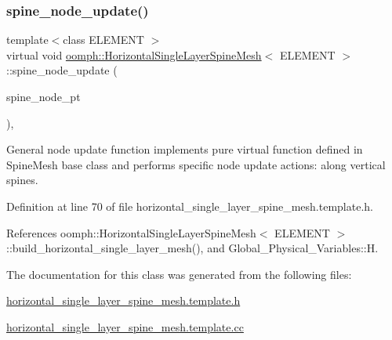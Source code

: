 \subsubsection{\texorpdfstring{spine\+\_\+node\+\_\+update()}{spine\_node\_update()}}
{\footnotesize\ttfamily template$<$class E\+L\+E\+M\+E\+NT $>$ \\
virtual void \hyperlink{classoomph_1_1HorizontalSingleLayerSpineMesh}{oomph\+::\+Horizontal\+Single\+Layer\+Spine\+Mesh}$<$ E\+L\+E\+M\+E\+NT $>$\+::spine\+\_\+node\+\_\+update (\begin{DoxyParamCaption}\item[{Spine\+Node $\ast$}]{spine\+\_\+node\+\_\+pt }\end{DoxyParamCaption})\hspace{0.3cm}{\ttfamily [inline]}, {\ttfamily [virtual]}}



General node update function implements pure virtual function defined in Spine\+Mesh base class and performs specific node update actions\+: along vertical spines. 



Definition at line 70 of file horizontal\+\_\+single\+\_\+layer\+\_\+spine\+\_\+mesh.\+template.\+h.



References oomph\+::\+Horizontal\+Single\+Layer\+Spine\+Mesh$<$ E\+L\+E\+M\+E\+N\+T $>$\+::build\+\_\+horizontal\+\_\+single\+\_\+layer\+\_\+mesh(), and Global\+\_\+\+Physical\+\_\+\+Variables\+::H.



The documentation for this class was generated from the following files\+:\begin{DoxyCompactItemize}
\item 
\hyperlink{horizontal__single__layer__spine__mesh_8template_8h}{horizontal\+\_\+single\+\_\+layer\+\_\+spine\+\_\+mesh.\+template.\+h}\item 
\hyperlink{horizontal__single__layer__spine__mesh_8template_8cc}{horizontal\+\_\+single\+\_\+layer\+\_\+spine\+\_\+mesh.\+template.\+cc}\end{DoxyCompactItemize}
